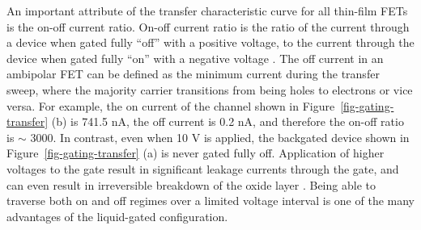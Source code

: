 \documentclass[
  a4paper,
]{scrbook}
\begin{document}
An important attribute of the transfer characteristic curve for all
thin-film FETs is the on-off current ratio. On-off current ratio is the
ratio of the current through a device when gated fully ``off'' with a
positive voltage, to the current through the device when gated fully
``on'' with a negative voltage \autocite{Zheng2017}. The off current in
an ambipolar FET can be defined as the minimum current during the
transfer sweep, where the majority carrier transitions from being holes
to electrons or vice versa. For example, the on current of the channel
shown in Figure~\ref{fig-gating-transfer} (b) is 741.5 nA, the off
current is 0.2 nA, and therefore the on-off ratio is \(\sim\) 3000. In
contrast, even when 10 V is applied, the backgated device shown in
Figure~\ref{fig-gating-transfer} (a) is never gated fully off.
Application of higher voltages to the gate result in significant leakage
currents through the gate, and can even result in irreversible breakdown
of the oxide layer \autocite{Sze2006}. Being able to traverse both on
and off regimes over a limited voltage interval is one of the many
advantages of the liquid-gated configuration.
\end{document}
